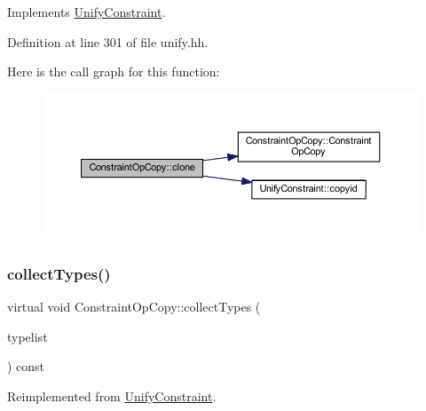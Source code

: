 Implements \mbox{\hyperlink{class_unify_constraint_a4f068343932637d355644bb21559aa12}{Unify\+Constraint}}.



Definition at line 301 of file unify.\+hh.

Here is the call graph for this function\+:
\nopagebreak
\begin{figure}[H]
\begin{center}
\leavevmode
\includegraphics[width=350pt]{class_constraint_op_copy_a849dd1a8ef637ec99dc9d067ccb1eca9_cgraph}
\end{center}
\end{figure}
\mbox{\label{class_constraint_op_copy_a9419293afb9195630808c5b6120cd18c}} 
\subsubsection{\texorpdfstring{collectTypes()}{collectTypes()}}
{\footnotesize\ttfamily virtual void Constraint\+Op\+Copy\+::collect\+Types (\begin{DoxyParamCaption}\item[{vector$<$ \mbox{\hyperlink{class_unify_datatype}{Unify\+Datatype}} $>$ \&}]{typelist }\end{DoxyParamCaption}) const\hspace{0.3cm}{\ttfamily [virtual]}}



Reimplemented from \mbox{\hyperlink{class_unify_constraint_acb83b6bea3b21e13054e72ac9cfaba0f}{Unify\+Constraint}}.

\mbox{\label{class_constraint_op_copy_a0b79f0fa69317b313528c537e71c2464}} 
